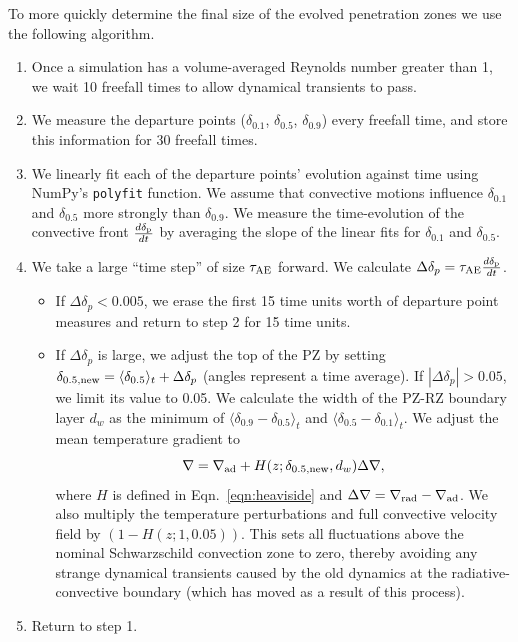\documentclass[twocolumn, linenumbers]{aastex631}
\newcommand{\gradrad}{\ensuremath{\nabla_{\rm{rad}}}}
\newcommand{\gradad}{\ensuremath{\nabla_{\rm{ad}}}}
\newcommand{\justgrad}{\ensuremath{\nabla}}
\newcommand{\delp}{\ensuremath{\delta_{\rm{p}}}}
\newcommand{\angles}[1]{\langle #1 \rangle}
\newcommand{\editone}[1]{#1}
\begin{document}
To more quickly determine the final size of the evolved penetration zones we use the following algorithm.
\begin{enumerate}
\item Once a simulation has a volume-averaged Reynolds number greater than 1, we wait 10 freefall times to allow dynamical transients to pass.
\item We measure the departure points ($\delta_{0.1}$, $\delta_{0.5}$, $\delta_{0.9}$) every freefall time, and store this information for 30 freefall times.
\item We linearly fit each of the departure points' evolution against time using NumPy's \texttt{polyfit} function.
We assume that convective motions influence $\delta_{0.1}$ and $\delta_{0.5}$ more strongly than $\delta_{0.9}$.
We measure the time-evolution of the convective front $\frac{d \delp}{dt}$ by averaging the slope of the linear fits for $\delta_{0.1}$ and $\delta_{0.5}$.
\item We take a large ``time step'' of size $\tau_{\rm{AE}}$ forward.
We calculate $\Delta \delta_p = \tau_{\rm{AE}} \frac{d \delp}{dt}$.
\begin{itemize}
\item If $\Delta \delta_p < 0.005$, we erase the first 15 time units worth of departure point measures and return to step 2 for 15 time units.
\item  If $\Delta \delta_p$ is large, we adjust the top of the PZ by setting $\delta_{0.5,\rm{new}} = \angles{\delta_{0.5}}_t + \Delta \delta_p$ (angles represent a time average).
If $|\Delta \delta_p| > 0.05$, we limit its value to 0.05.
We calculate the width of the \editone{PZ-RZ boundary layer} $d_w$ as the minimum of $\angles{\delta_{0.9} - \delta_{0.5}}_t$ and $\angles{\delta_{0.5} - \delta_{0.1}}_t$.
We adjust the mean temperature gradient to
\begin{equation}
\justgrad = \gradad + H(z; \delta_{\rm{0.5,\rm{new}}}, d_w) \Delta\justgrad,
\label{eqn:initial_grad}
\end{equation}
where $H$ is defined in Eqn.~\ref{eqn:heaviside} and $\Delta\justgrad = \gradrad - \gradad$.
We also multiply the temperature perturbations and full convective velocity field by $(1 - H(z; 1, 0.05))$.
This sets all fluctuations above the nominal Schwarzschild convection zone to zero, thereby avoiding any strange dynamical transients caused by the old dynamics at the radiative-convective boundary (which has moved as a result of this process).
\end{itemize}
\item Return to step 1.
\end{enumerate}
\end{document}
